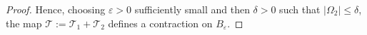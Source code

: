 \documentclass[12pt, a4paper]{amsart}
\numberwithin{equation}{section}
\newcommand{\md}{m_{d}}  %
\newcommand{\Lp}[1]
{{
		L^
		{
			\ifthenelse
			{
				\isempty{#1}
			}
			{
				p
			}
			{
				#1
			}
		}(\Omega)
}}
\newenvironment{nalign}
{\begin{equation}\begin{aligned}}
		{\end{aligned}\end{equation}\ignorespacesafterend}
\begin{document}
\begin{proof}
Hence, choosing \(\varepsilon>0\) sufficiently small and then \(\delta>0\) such that
\(|\Omega_2|\leqslant\delta\), the map \(\mathcal T:=\mathcal T_1+\mathcal T_2\) defines a contraction on \(B_\varepsilon\).
\end{proof}

\end{document}
